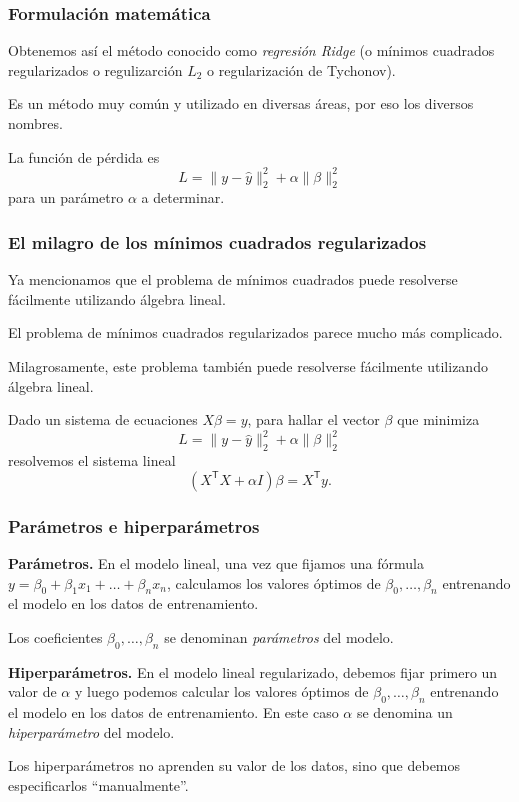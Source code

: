 \documentclass[aspectratio=169,12pt]{beamer}
\begin{document}
\begin{frame}
\frametitle{Formulación matemática}

Obtenemos así el método conocido como \emph{regresión Ridge} (o mínimos cuadrados regularizados o regulizarción $L_2$ o regularización de Tychonov).

Es un método muy común y utilizado en diversas áreas, por eso los diversos nombres.

La función de pérdida es
$$
L = \|y - \hat y\|_2^2 + \alpha \|\beta\|_2^2
$$
para un parámetro $\alpha$ a determinar.

\end{frame}

\begin{frame}
\frametitle{El milagro de los mínimos cuadrados regularizados}

Ya mencionamos que el problema de mínimos cuadrados puede resolverse fácilmente utilizando álgebra lineal.

El problema de mínimos cuadrados regularizados parece mucho más complicado.

Milagrosamente, este problema también puede resolverse fácilmente  utilizando álgebra lineal.

Dado un sistema de ecuaciones $X \beta = y$, para hallar el vector $\beta$ que minimiza
$$L = \|y - \hat y\|_2^2 + \alpha \|\beta\|_2^2$$
resolvemos el sistema lineal
$$
\left(X^{\mathsf {T}}X+ \alpha I\right) \beta = X^{\mathsf {T}}{y}.
$$

\end{frame}

\begin{frame}
\frametitle{Parámetros e hiperparámetros}

\textbf{Parámetros.} En el modelo lineal, una vez que fijamos una fórmula $y = \beta_0 + \beta_1 x_1 + \dots + \beta_n x_n$, calculamos los valores óptimos de $\beta_0, \dots, \beta_n$ entrenando el modelo en los datos de entrenamiento.

Los coeficientes $\beta_0, \dots, \beta_n$ se denominan \emph{parámetros} del modelo.

\textbf{Hiperparámetros.} En el modelo lineal regularizado, debemos fijar primero un valor de $\alpha$ y luego podemos calcular los valores óptimos de $\beta_0, \dots, \beta_n$ entrenando el modelo en los datos de entrenamiento. En este caso $\alpha$ se denomina un \emph{hiperparámetro} del modelo.

Los hiperparámetros no aprenden su valor de los datos, sino que debemos especificarlos ``manualmente''.
\end{frame}
\end{document}

